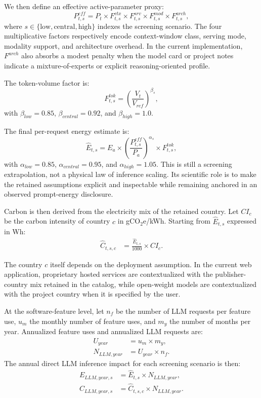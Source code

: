 \documentclass[11pt,a4paper]{article}
\begin{document}
We then define an effective active-parameter proxy:
\begin{equation}
P^{eff}_{t,s} = P_t \times F^{ctx}_{t,s} \times F^{srv}_{t,s} \times F^{mod}_{t,s} \times F^{arch}_{t,s},
\end{equation}
where $s \in \{\text{low}, \text{central}, \text{high}\}$ indexes the screening scenario. The four multiplicative factors respectively encode context-window class, serving mode, modality support, and architecture overhead. In the current implementation, $F^{arch}$ also absorbs a modest penalty when the model card or project notes indicate a mixture-of-experts or explicit reasoning-oriented profile.

The token-volume factor is:
\begin{equation}
F^{tok}_{t,s} = \left(\frac{V_t}{V_{ref}}\right)^{\beta_s},
\end{equation}
with $\beta_{low}=0.85$, $\beta_{central}=0.92$, and $\beta_{high}=1.0$.

The final per-request energy estimate is:
\begin{equation}
\hat{E}_{t,s} = E_a \times \left(\frac{P^{eff}_{t,s}}{P_a}\right)^{\alpha_s} \times F^{tok}_{t,s},
\end{equation}
with $\alpha_{low}=0.85$, $\alpha_{central}=0.95$, and $\alpha_{high}=1.05$. This is still a screening extrapolation, not a physical law of inference scaling. Its scientific role is to make the retained assumptions explicit and inspectable while remaining anchored in an observed prompt-energy disclosure.

Carbon is then derived from the electricity mix of the retained country. Let $CI_c$ be the carbon intensity of country $c$ in gCO$_2$e/kWh. Starting from $\hat{E}_{t,s}$ expressed in Wh:
\begin{align}
\hat{C}_{t,s,c} &= \frac{\hat{E}_{t,s}}{1000}\times CI_c.
\end{align}

The country $c$ itself depends on the deployment assumption. In the current web application, proprietary hosted services are contextualized with the publisher-country mix retained in the catalog, while open-weight models are contextualized with the project country when it is specified by the user.

At the software-feature level, let $n_f$ be the number of LLM requests per feature use, $u_m$ the monthly number of feature uses, and $m_y$ the number of months per year. Annualized feature uses and annualized LLM requests are:
\begin{align}
U_{year} &= u_m \times m_y,\\
N_{LLM,year} &= U_{year}\times n_f.
\end{align}
The annual direct LLM inference impact for each screening scenario is then:
\begin{align}
E_{LLM,year,s} &= \hat{E}_{t,s}\times N_{LLM,year},\\
C_{LLM,year,s} &= \hat{C}_{t,s,c}\times N_{LLM,year}.
\end{align}
\end{document}
